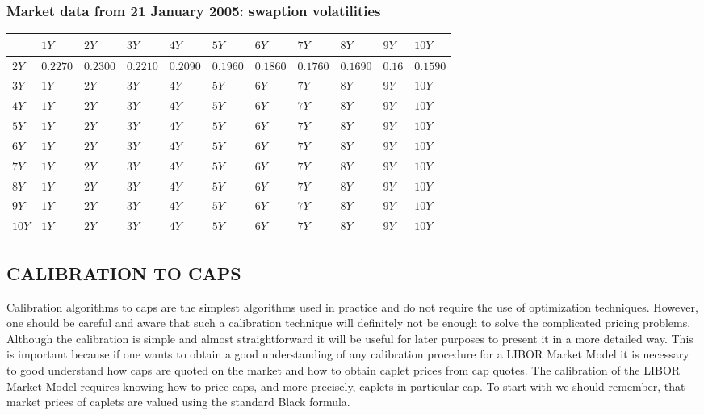 \documentclass[11pt]{article}
\numberwithin{equation}{subsection}
\begin{document}
\subsubsection{Market data from 21 January 2005: swaption volatilities}
\vskip 0.4cm 		
{
	\centering
	\begin{tabular}{|l|l|l|l|l|l|l|l|l|l|l|}
		\hline
		& \(1Y\) & \(2Y\) & \(3Y\) & \(4Y\) & \(5Y\) & \(6Y\) & \(7Y\) & \(8Y\) & \(9Y\) & \(10Y\) \\		
		\hline		
		\(2Y\) & \(0.2270\) & \(0.2300\) & \(0.2210\) & \(0.2090\) & \(0.1960\) & \(0.1860\) & \(0.1760\) & \(0.1690\) & \(0.16\) & \(0.1590\) \\
		\hline
		\(3Y\) & \(1Y\) & \(2Y\) & \(3Y\) & \(4Y\) & \(5Y\) & \(6Y\) & \(7Y\) & \(8Y\) & \(9Y\) & \(10Y\) \\
		\hline				 				
		\(4Y\) & \(1Y\) & \(2Y\) & \(3Y\) & \(4Y\) & \(5Y\) & \(6Y\) & \(7Y\) & \(8Y\) & \(9Y\) & \(10Y\) \\
		\hline				 				
		\(5Y\) & \(1Y\) & \(2Y\) & \(3Y\) & \(4Y\) & \(5Y\) & \(6Y\) & \(7Y\) & \(8Y\) & \(9Y\) & \(10Y\) \\
		\hline				 				
		\(6Y\) & \(1Y\) & \(2Y\) & \(3Y\) & \(4Y\) & \(5Y\) & \(6Y\) & \(7Y\) & \(8Y\) & \(9Y\) & \(10Y\) \\
		\hline				 				
		\(7Y\) & \(1Y\) & \(2Y\) & \(3Y\) & \(4Y\) & \(5Y\) & \(6Y\) & \(7Y\) & \(8Y\) & \(9Y\) & \(10Y\) \\
		\hline				 				
		\(8Y\) & \(1Y\) & \(2Y\) & \(3Y\) & \(4Y\) & \(5Y\) & \(6Y\) & \(7Y\) & \(8Y\) & \(9Y\) & \(10Y\) \\
		\hline				 				
		\(9Y\) & \(1Y\) & \(2Y\) & \(3Y\) & \(4Y\) & \(5Y\) & \(6Y\) & \(7Y\) & \(8Y\) & \(9Y\) & \(10Y\) \\
		\hline				 				
		\(10Y\) & \(1Y\) & \(2Y\) & \(3Y\) & \(4Y\) & \(5Y\) & \(6Y\) & \(7Y\) & \(8Y\) & \(9Y\) & \(10Y\) \\
		\hline				 				
	\end{tabular}
}
\vskip 0.4cm

\subsection{CALIBRATION TO CAPS}
Calibration algorithms to caps are the simplest algorithms used in practice and do not
require the use of optimization techniques. However, one should be careful and aware that
such a calibration technique will definitely not be enough to solve the complicated pricing
problems. Although the calibration is simple and almost straightforward it will be useful for
later purposes to present it in a more detailed way. This is important because if one wants to
obtain a good understanding of any calibration procedure for a LIBOR Market Model it is
necessary to good understand how caps are quoted on the market and how to obtain caplet
prices from cap quotes.
The calibration of the LIBOR Market Model requires knowing how to price caps, and
more precisely, caplets in particular cap. To start with we should remember, that market
prices of caplets are valued using the standard Black formula.
\end{document}
